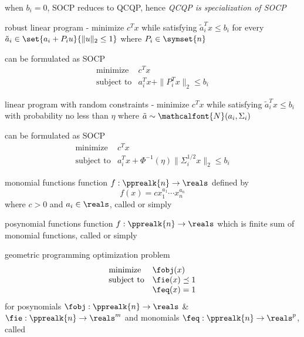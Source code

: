 \documentclass[17pt,landscape]{foils}
\newcommand\normal{\mathcalfont{N}}
\begin{document}
{\bit
\item
	when $b_i=0$, SOCP reduces to QCQP,
	hence \emph{QCQP is specialization of SOCP}
\eit



\bit
\item
	robust linear program
	-
	minimize $c^T x$
	while satisfying
	$\tilde{a}_i^T x \leq b_i$
	for every $\tilde{a}_i \in \set{a_i+P_iu}{\|u\|_2\leq1}$
	where $P_i\in\symset{n}$\
	\bit
	\item can be formulated as SOCP
		$$
			\begin{array}{ll}
				\mbox{minimize} &
					c^T x
				\\
				\mbox{subject to} &
					a_i^T x + \|P_i^T x\|_2 \leq b_i
			\end{array}
		$$
	\eit

\vitem
	linear program with random constraints
	-
	minimize $c^T x$
	while satisfying
	$\tilde{a}_i^T x \leq b_i$
	with probability no less than $\eta$
	where $\tilde{a} \sim \normal(a_i,\Sigma_i)$
	\bit
	\item
		can be formulated as SOCP
		$$
			\begin{array}{ll}
				\mbox{minimize} &
					c^T x
				\\
				\mbox{subject to} &
					a_i^T x + \Phi^{-1}(\eta)\|\Sigma_i^{1/2} x\|_2 \leq b_i
			\end{array}
		$$
	\eit
\eit
\vfill



\begin{mydefinition}{monomial functions}
	function $f:\pprealk{n}\to\reals$
	defined by
	$$
		f(x) = cx_1^{a_1} \cdots x_n^{a_n}
	$$
	where $c>0$ and $a_i\in\reals$,
	called 
	or simply 
\end{mydefinition}

\begin{mydefinition}{posynomial functions}
	function $f:\pprealk{n}\to\reals$
	which is finite sum of monomial functions,
	called 
	or simply 
\end{mydefinition}

\begin{mydefinition}{geometric programming}
	optimization problem
		$$
			\begin{array}{ll}
				\mbox{minimize} &
					\fobj(x)
				\\
				\mbox{subject to} &
					\fie(x) \preceq 1
				\\ &
					\feq(x) =1
			\end{array}
		$$
	for posynomials $\fobj:\pprealk{n} \to \reals$ \& $\fie: \pprealk{n} \to \reals^m$
	and monomials $\feq: \pprealk{n} \to \reals^p$,
	called 
\end{mydefinition}


}
\end{document}
